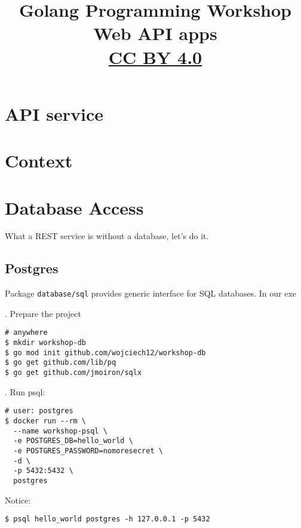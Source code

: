 \documentclass[11pt, letterpaper]{article}
\title{Golang Programming Workshop\\Web API apps\\{ \small \href{https://creativecommons.org/licenses/by/4.0/}{CC BY 4.0} }  }
\date{}
\begin{document}

\begin{titlepage}
\maketitle
\end{titlepage}

\tableofcontents
\pagebreak

\section{{\small API} service}

\section{Context}

\section{Database Access}
What a {\small REST} service is without a database, let's do it.

\subsection{Postgres}

Package \verb|database/sql| provides generic interface for {\small SQL} databases. In our exe

. Prepare the project

\begin{verbatim}
# anywhere 
$ mkdir workshop-db
$ go mod init github.com/wojciech12/workshop-db
$ go get github.com/lib/pq
$ go get github.com/jmoiron/sqlx
\end{verbatim}

. Run psql:

\begin{verbatim}
# user: postgres
$ docker run --rm \
  --name workshop-psql \
  -e POSTGRES_DB=hello_world \
  -e POSTGRES_PASSWORD=nomoresecret \
  -d \
  -p 5432:5432 \
  postgres
\end{verbatim}

Notice:

\begin{verbatim}
$ psql hello_world postgres -h 127.0.0.1 -p 5432
\end{verbatim}
\end{document}

